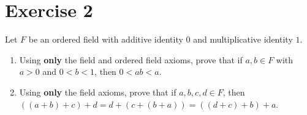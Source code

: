 \documentclass[11pt]{article}
\begin{document}
\section{Exercise 2}
    Let $F$ be an ordered field with additive identity $0$ and multiplicative identity $1$.
    \begin{enumerate}[label=(\alph*)]
        \item
        Using \textbf{only} the field and ordered field axioms, prove that if $a, b \in F$ with $a > 0$ and $0 < b < 1$, then $0 < ab < a$.
        
        \item 
        Using \textbf{only} the field axioms, prove that if $a, b, c, d \in F$, then $((a + b) + c) + d = d + (c + (b + a)) = ((d + c) + b) + a$.
    \end{enumerate} 
\end{document}
